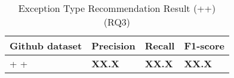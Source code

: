 \begin{table}[t]%
  \caption{Exception Type Recommendation Result (\xblock+\xstate+\xtype) (RQ3)}
  \vspace{-12pt}
  \small
	\begin{center}
		\renewcommand{\arraystretch}{1}
		\begin{tabular}{| p{3.10cm}<{\centering} | p{1.2cm}<{\centering} | p{1.2cm}<{\centering}| p{1.2cm}<{\centering}|}
		  \hline
			Github dataset  & Precision  & Recall & F1-score \\
			\hline
			\xblock + \xstate  + \xtype  & \textbf{XX.X}  &  \textbf{XX.X} & \textbf{XX.X}\\
			\hline
		\end{tabular}
		\label{tab:xtype-4}
	\end{center}

\end{table}